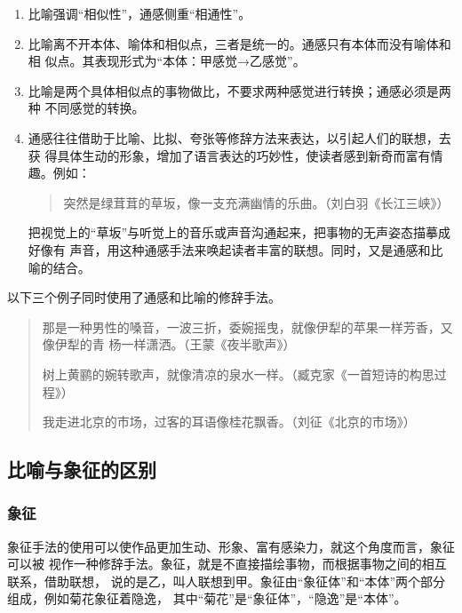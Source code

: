 \documentclass[final,oneside]{ctexbook}
\newenvironment{equotation}{\begin{quotation}\kaishu}{\end{quotation}}
\begin{document}
\begin{enumerate}
  \item 比喻强调“相似性”，通感侧重“相通性”。

  \item 比喻离不开本体、喻体和相似点，三者是统一的。通感只有本体而没有喻体和相
    似点。其表现形式为“本体：甲感觉→乙感觉”。

  \item 比喻是两个具体相似点的事物做比，不要求两种感觉进行转换；通感必须是两种
    不同感觉的转换。

  \item 通感往往借助于比喻、比拟、夸张等修辞方法来表达，以引起人们的联想，去获
    得具体生动的形象，增加了语言表达的巧妙性，使读者感到新奇而富有情趣。例如：

    \begin{equotation}
      突然是绿茸茸的草坂，像一支充满幽情的乐曲。（刘白羽《长江三峡》）
    \end{equotation}
    把视觉上的“草坂”与听觉上的音乐或声音沟通起来，把事物的无声姿态描摹成好像有
    声音，用这种通感手法来唤起读者丰富的联想。同时，又是通感和比喻的结合。

\end{enumerate}

以下三个例子同时使用了通感和比喻的修辞手法。
\begin{equotation}
  那是一种男性的嗓音，一波三折，委婉摇曳，就像伊犁的苹果一样芳香，又像伊犁的青
  杨一样潇洒。（王蒙《夜半歌声》）

  树上黄鹂的婉转歌声，就像清凉的泉水一样。（臧克家《一首短诗的构思过程》）

  我走进北京的市场，过客的耳语像桂花飘香。（刘征《北京的市场》）
\end{equotation}

\subsection{比喻与象征的区别}

\subsubsection{象征}

象征手法的使用可以使作品更加生动、形象、富有感染力，就这个角度而言，象征可以被
视作一种修辞手法。象征，就是不直接描绘事物，而根据事物之间的相互联系，借助联想，
说的是乙，叫人联想到甲。象征由“象征体”和“本体”两个部分组成，例如菊花象征着隐逸，
其中“菊花”是“象征体”，“隐逸”是“本体”。
\end{document}
